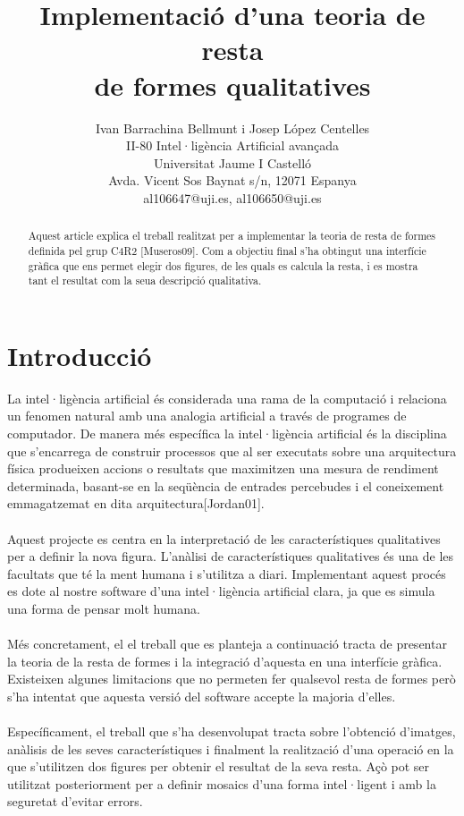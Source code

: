 \documentclass{article}
\title{Implementació d'una teoria de resta\\
 de formes qualitatives}
\author{Ivan Barrachina Bellmunt i Josep López Centelles\\
II-80 Intel·ligència Artificial avançada\\
Universitat Jaume I Castelló\\
Avda. Vicent Sos Baynat s/n, 12071 Espanya \\
al106647@uji.es, al106650@uji.es}
\begin{document}
\maketitle

\begin{abstract}
Aquest article explica el treball realitzat per a implementar la teoria de resta de formes definida pel grup C4R2 [Museros09].
Com a objectiu final s'ha obtingut una interfície gràfica que ens permet elegir dos figures, de les quals es calcula la resta, i es mostra tant el resultat com la seua descripció qualitativa.
\end{abstract}

\section{Introducció}
La intel·ligència artificial és considerada una rama de la computació i relaciona un fenomen natural amb una analogia artificial a través de programes de computador.
De manera més específica la intel·ligència artificial és la disciplina que s'encarrega de construir processos que al ser executats sobre una arquitectura física produeixen accions o resultats que maximitzen una mesura de rendiment determinada, basant-se en la seqüència de entrades percebudes i el coneixement emmagatzemat en dita arquitectura[Jordan01].
\\
\\
Aquest projecte es centra en la interpretació de les característiques qualitatives per a definir la nova figura.
L'anàlisi de característiques qualitatives és una de les facultats que té la ment humana i s'utilitza a diari.
Implementant aquest procés es dote al nostre software d'una intel·ligència artificial clara, ja que es simula una forma de pensar molt humana.
\\
\\
Més concretament, el el treball que es planteja a continuació tracta de presentar la teoria de la resta de formes i la integració d'aquesta en una interfície gràfica.
Existeixen algunes limitacions que no permeten fer qualsevol resta de formes però s'ha intentat que aquesta versió del software accepte la majoria d'elles.
\\
\\
Específicament, el treball que s'ha desenvolupat tracta sobre l'obtenció d'imatges, anàlisis de les seves característiques i finalment la realització d'una operació en la que s'utilitzen dos figures per obtenir el resultat de la seva resta.
Açò pot ser utilitzat posteriorment per a definir mosaics d'una forma intel·ligent i amb la seguretat d'evitar errors.
\end{document}
